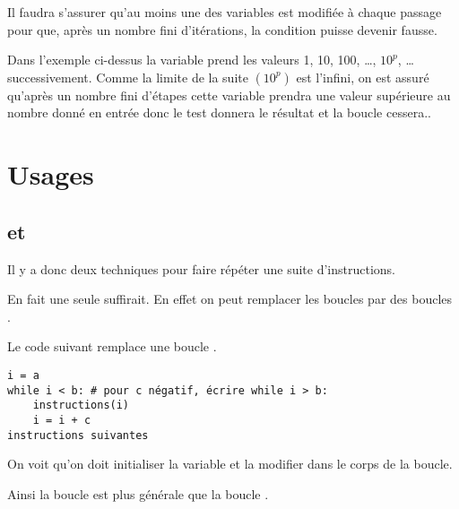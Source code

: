 Il faudra s'assurer qu'au moins une des variables est modifiée à chaque passage pour que, après un nombre fini d'itérations, la condition puisse devenir fausse.

Dans l'exemple ci-dessus la variable  prend les valeurs 1, 10, 100, \dots, $10^p$, \dots  successivement. Comme la limite de la suite $(10^p)$ est l'infini, on est assuré qu'après un nombre fini d'étapes cette variable prendra une valeur supérieure au nombre donné en entrée donc le test donnera le résultat  et la boucle cessera..
\section{Usages}
\subsection{ et }
Il y a donc deux techniques pour faire répéter une suite d'instructions.

En fait une seule suffirait. En effet on peut remplacer les boucles  par des boucles .

Le code suivant remplace une boucle .

\begin{lstlisting}
i = a
while i < b: # pour c négatif, écrire while i > b:
    instructions(i)
    i = i + c
instructions suivantes
\end{lstlisting}

On voit qu'on doit initialiser la variable  et la modifier dans le corps de la boucle.

\medskip

Ainsi la boucle  est plus générale que la boucle . 

